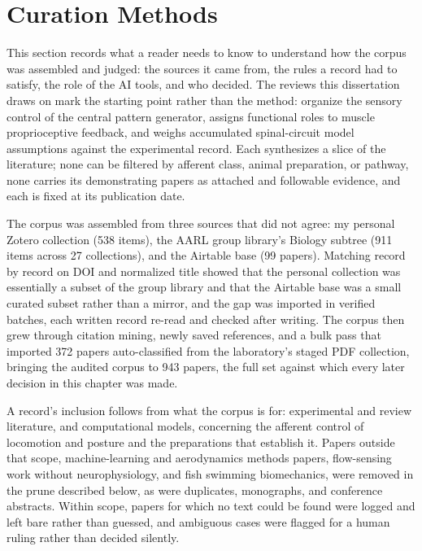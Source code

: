 \section{Curation Methods}\label{sec:sadb_methods}

This section records what a reader needs to know to understand how the corpus was assembled and judged: the sources it came from, the rules a record had to satisfy, the role of the AI tools, and who decided. The reviews this dissertation draws on mark the starting point rather than the method: \citet{van_de_crommert_review_1998} organize the sensory control of the central pattern generator, \citet{windhorst_muscle_2007} assigns functional roles to muscle proprioceptive feedback, and \citet{windhorst_spinal_2022} weighs accumulated spinal-circuit model assumptions against the experimental record. Each synthesizes a slice of the literature; none can be filtered by afferent class, animal preparation, or pathway, none carries its demonstrating papers as attached and followable evidence, and each is fixed at its publication date.

The corpus was assembled from three sources that did not agree: my personal Zotero collection (538 items), the AARL group library's Biology subtree (911 items across 27 collections), and the Airtable base (99 papers). Matching record by record on DOI and normalized title showed that the personal collection was essentially a subset of the group library and that the Airtable base was a small curated subset rather than a mirror, and the gap was imported in verified batches, each written record re-read and checked after writing. The corpus then grew through citation mining, newly saved references, and a bulk pass that imported 372 papers auto-classified from the laboratory's staged PDF collection, bringing the audited corpus to 943 papers, the full set against which every later decision in this chapter was made.

A record's inclusion follows from what the corpus is for: experimental and review literature, and computational models, concerning the afferent control of locomotion and posture and the preparations that establish it. Papers outside that scope, machine-learning and aerodynamics methods papers, flow-sensing work without neurophysiology, and fish swimming biomechanics, were removed in the prune described below, as were duplicates, monographs, and conference abstracts. Within scope, papers for which no text could be found were logged and left bare rather than guessed, and ambiguous cases were flagged for a human ruling rather than decided silently.

